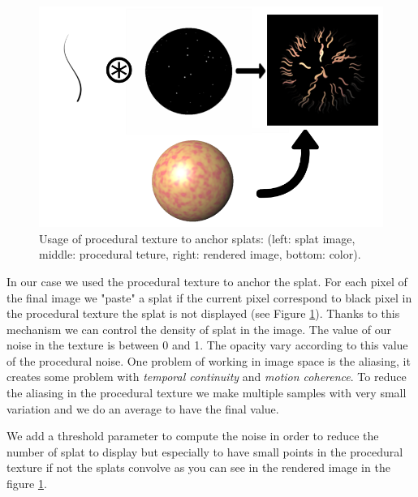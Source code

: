 
\begin{figure}
    \begin{center}
    \includegraphics[scale=0.6]{images/noise/addition.png}
    \end{center}
    \caption{Usage of procedural texture to anchor splats: (left: splat image, middle: procedural teture, right: rendered image, bottom: color).}
    \label{procedural_noise_anchor}
\end{figure}

In our case we used the procedural texture to anchor the splat. For each pixel of the final image we "paste" a splat if the current pixel correspond to black pixel in the procedural texture the splat is not displayed (see Figure \ref{procedural_noise_anchor}). Thanks to this mechanism we can control the density of splat in the image. The value of our noise in the texture is between 0 and 1. The opacity vary according to this value of the procedural noise. One problem of working in image space is the aliasing, it creates some problem with \textit{temporal continuity} and \textit{motion coherence}. To reduce the aliasing in the procedural texture we make multiple samples with very small variation and we do an average to have the final value.

We add a threshold parameter to compute the noise in order to reduce the number of splat to display but especially to have small points in the procedural texture if not the splats convolve as you can see in the rendered image in the figure \ref{procedural_noise_anchor}.


